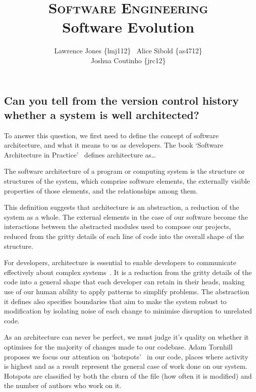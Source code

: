 \documentclass[11pt]{article}
\title{\textsc{Software Engineering}\\Software Evolution}
\author{Lawrence Jones \{lmj112\} \  Alice Sibold \{as4712\} \\
        Joshua Coutinho \{jrc12\}}
\date{}
\begin{document}
\maketitle


\subsection*{Can you tell from the version control history whether a system is
well architected?}

To answer this question, we first need to define the concept of software
architecture, and what it means to us as developers. The book `Software
Architecture in Practice'~\cite{softwareArchitectureInPractice} defines
architecture as\dots

\begin{displayquote}
The software architecture of a program or computing system is the structure or
structures of the system, which comprise software elements, the externally
visible properties of those elements, and the relationships among them.
\end{displayquote}

This definition suggests that architecture is an abstraction, a reduction of the
system as a whole. The external elements in the case of our software become the
interactions between the abstracted modules used to compose our projects,
reduced from the gritty details of each line of code into the overall shape of
the structure.

For developers, architecture is essential to enable developers to communicate
effectively about complex systems~\cite{anIntroductionToSoftwareArchitecture}.
It is a reduction from the gritty details of the code into a general shape that
each developer can retain in their heads, making use of our human ability to
apply patterns to simplify problems. The abstraction it defines also specifies
boundaries that aim to make the system robust to modification by isolating noise
of each change to minimise disruption to unrelated code.

As an architecture can never be perfect, we must judge it's quality on whether
it optimises for the majority of changes made to our codebase. Adam Tornhill
proposes we focus our attention on `hotspots'~\cite{codeAsCrimeScene} in our
code, places where activity is highest and as a result represent the general
case of work done on our system. Hotspots are classified by both the churn of
the file (how often it is modified) and the number of authors who work on it.
\end{document}
